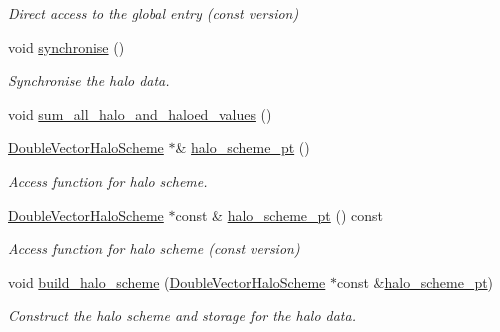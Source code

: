 \begin{DoxyCompactItemize}
\begin{DoxyCompactList}\small\item\em Direct access to the global entry (const version) \end{DoxyCompactList}\item 
void \hyperlink{classoomph_1_1DoubleVectorWithHaloEntries_a6d5b6e2c1c80d4fb468c851030d62492}{synchronise} ()
\begin{DoxyCompactList}\small\item\em Synchronise the halo data. \end{DoxyCompactList}\item 
void \hyperlink{classoomph_1_1DoubleVectorWithHaloEntries_a7165745d3397b6ea9d87f123cc97e5c9}{sum\+\_\+all\+\_\+halo\+\_\+and\+\_\+haloed\+\_\+values} ()
\item 
\hyperlink{classoomph_1_1DoubleVectorHaloScheme}{Double\+Vector\+Halo\+Scheme} $\ast$\& \hyperlink{classoomph_1_1DoubleVectorWithHaloEntries_a233cb55111ceb501a7a76c434801be4c}{halo\+\_\+scheme\+\_\+pt} ()
\begin{DoxyCompactList}\small\item\em Access function for halo scheme. \end{DoxyCompactList}\item 
\hyperlink{classoomph_1_1DoubleVectorHaloScheme}{Double\+Vector\+Halo\+Scheme} $\ast$const  \& \hyperlink{classoomph_1_1DoubleVectorWithHaloEntries_a4c4d6f14ca068dc33f318cbdde6b34c5}{halo\+\_\+scheme\+\_\+pt} () const
\begin{DoxyCompactList}\small\item\em Access function for halo scheme (const version) \end{DoxyCompactList}\item 
void \hyperlink{classoomph_1_1DoubleVectorWithHaloEntries_a1aab1a84c6a82a755fdc3c6b27ce49d7}{build\+\_\+halo\+\_\+scheme} (\hyperlink{classoomph_1_1DoubleVectorHaloScheme}{Double\+Vector\+Halo\+Scheme} $\ast$const \&\hyperlink{classoomph_1_1DoubleVectorWithHaloEntries_a233cb55111ceb501a7a76c434801be4c}{halo\+\_\+scheme\+\_\+pt})
\begin{DoxyCompactList}\small\item\em Construct the halo scheme and storage for the halo data. \end{DoxyCompactList}\end{DoxyCompactItemize}
